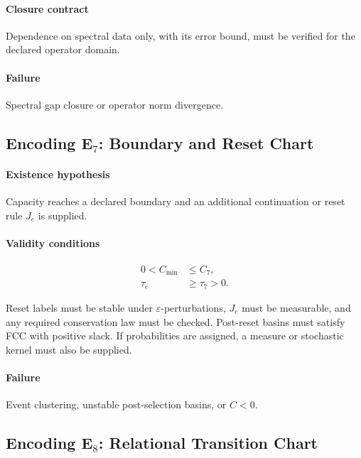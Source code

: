 \documentclass[11pt]{article}
\theoremstyle{plain}
\theoremstyle{plain}
\begin{document}
\paragraph{Closure contract}
Dependence on spectral data only, with its error bound, must be verified for
the declared operator domain.

\paragraph{Failure}
Spectral gap closure or operator norm divergence.


\subsection{Encoding \texorpdfstring{E$_7$}{E7}: Boundary and Reset Chart}

\paragraph{Existence hypothesis}
Capacity reaches a declared boundary and an additional continuation or reset
rule $J_e$ is supplied.

\paragraph{Validity conditions}
\begin{align}
0 < C_{\min} &\le C_7, \\
\tau_e &\ge \tau_7 > 0.
\end{align}

Reset labels must be stable under $\varepsilon$-perturbations, $J_e$ must be
measurable, and any required conservation law must be checked.  Post-reset
basins must satisfy FCC with positive slack.  If probabilities are assigned,
a measure or stochastic kernel must also be supplied.

\paragraph{Failure}
Event clustering, unstable post-selection basins,
or $C<0$.
\subsection{Encoding \texorpdfstring{E$_8$}{E8}: Relational Transition Chart}
\end{document}
